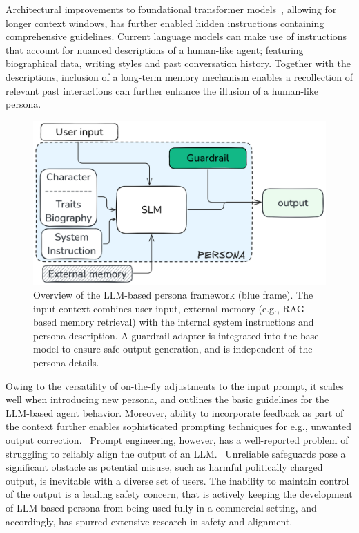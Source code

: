 \documentclass[letterpaper]{article}
\begin{document}
Architectural improvements to foundational transformer models~\cite{vaswani2017attention}, allowing for longer context windows, has further enabled hidden instructions containing comprehensive guidelines. Current language models can make use of instructions that account for nuanced descriptions of a human-like agent; featuring biographical data, writing styles and past conversation history. 
Together with the descriptions, inclusion of a long-term memory mechanism enables a recollection of relevant past interactions can further enhance the illusion of a human-like persona.~\cite{ishikawacapturing} 
\begin{figure}[H]
	\centering
	\includegraphics[width=1.0\linewidth]{figures/introductionDiagram.png}
	\caption{Overview of the LLM-based persona framework (blue frame). The input context combines user input, external memory (e.g., RAG-based memory retrieval) with the internal system instructions and persona description. A guardrail adapter is integrated into the base model to ensure safe output generation, and is independent of the persona details.}\label{fig:introduction-diagram}
\end{figure}

Owing to the versatility of on-the-fly adjustments to the input prompt, it scales well when introducing new persona, and outlines the basic guidelines for the LLM-based agent behavior.
Moreover, ability to incorporate feedback as part of the context further enables sophisticated prompting techniques for e.g., unwanted output correction.~\cite{schulhoff2024prompt}
Prompt engineering, however, has a well-reported problem of struggling to reliably align the output of an LLM.~\cite{bhargava2023s, cao2024worst}  
Unreliable safeguards pose a significant obstacle as potential misuse, such as harmful politically charged output, is inevitable with a diverse set of users.
The inability to maintain control of the output is a leading safety concern, that is actively keeping the development of LLM-based persona from being used fully in a commercial setting, and accordingly, has spurred extensive research in safety and alignment.~\cite{ghosh2024aegis,zeng2024shieldgemma,han2024wildguard,inan2023llama}
\end{document}
